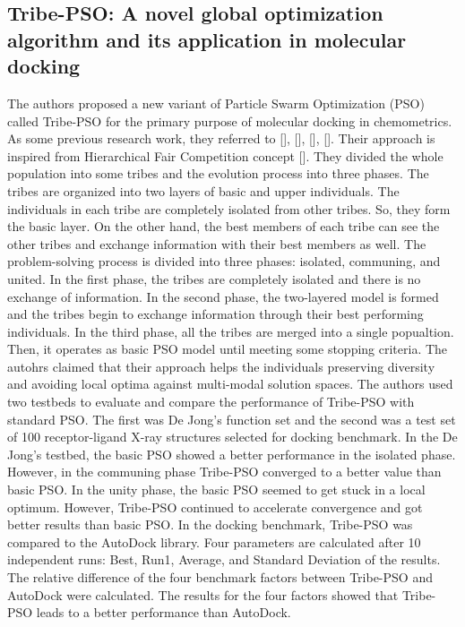 \subsection{Tribe-PSO: A novel global optimization algorithm and its application in molecular docking}
The authors proposed a new variant of Particle Swarm Optimization (PSO) called Tribe-PSO for the primary purpose of molecular docking in chemometrics. As some previous research work, they referred to [], [], [], []. Their approach is inspired from Hierarchical Fair Competition concept []. They divided the whole population into some tribes and the evolution process into three phases. The tribes are organized into two layers of basic and upper individuals. \newline The individuals in each tribe are completely isolated from other tribes. So, they form the basic layer. On the other hand, the best members of each tribe can see the other tribes and exchange information with their best members as well. The problem-solving process is divided into three phases: isolated, communing, and united. In the first phase, the tribes are completely isolated and there is no exchange of information. In the second phase, the two-layered model is formed and the tribes begin to exchange information through their best performing individuals. In the third phase, all the tribes are merged into a single popualtion. Then, it operates as basic PSO model until meeting some stopping criteria. The autohrs claimed that their approach helps the individuals preserving diversity and avoiding local optima against multi-modal solution spaces.\newline
The authors used two testbeds to evaluate and compare the performance of Tribe-PSO with standard PSO. The first was De Jong's function set and the second was a test set of 100 receptor-ligand X-ray structures selected for docking benchmark. In the De Jong's testbed, the basic PSO showed a better performance in the isolated phase. However, in the communing phase Tribe-PSO converged to a better value than basic PSO. In the unity phase, the basic PSO seemed to get stuck in a local optimum. However, Tribe-PSO continued to accelerate convergence and got better results than basic PSO. In the docking benchmark, Tribe-PSO was compared to the AutoDock library. Four parameters are calculated after 10 independent runs: Best, Run1, Average, and Standard Deviation of the results. The relative difference of the four benchmark factors between Tribe-PSO and AutoDock were calculated. The results for the four factors showed that Tribe-PSO leads to a better performance than AutoDock.
